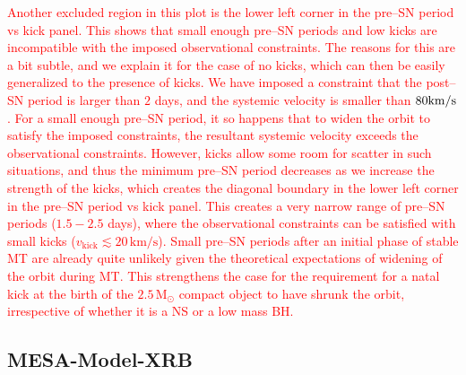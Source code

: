\documentclass[linenumbers,trackchanges,twocolumn]{aastex701}
\newcommand{\Mdot}{\mathrm{M}_{\odot}}
\newcommand{\red}{\textcolor{red}}
\begin{document}
\red{Another excluded region in this plot is the lower left corner in the pre--SN period vs kick panel. This shows that small enough pre--SN periods and low kicks are incompatible with the imposed observational constraints. The reasons for this are a bit subtle, and we explain it for the case of no kicks, which can then be easily generalized to the presence of kicks. We have imposed a constraint that the post--SN period is larger than $2$ days, and the systemic velocity is smaller than $80\rm km/s$. For a small enough pre--SN period, it so happens that to widen the orbit to satisfy the imposed constraints, the resultant systemic velocity exceeds the observational constraints. However, kicks allow some room for scatter in such situations, and thus the minimum pre--SN period decreases as we increase the strength of the kicks, which creates the diagonal boundary in the lower left corner in the pre--SN period vs kick panel.
This creates a very narrow range of pre--SN periods ($1.5-2.5$ days), where the observational constraints can be satisfied with small kicks ($v_{\mathrm{kick}} \lesssim 20 \, \mathrm{km/s}$). Small pre--SN periods after an initial phase of stable MT are already quite unlikely given the theoretical expectations of widening of the orbit during MT. This strengthens the case for the requirement for a natal kick at the birth of the $2.5 \,\Mdot$ compact object to have shrunk the orbit, irrespective of whether it is a NS or a low mass BH.}

\subsection{MESA-Model-XRB}\label{sec:mesa_xrb}

\end{document}
